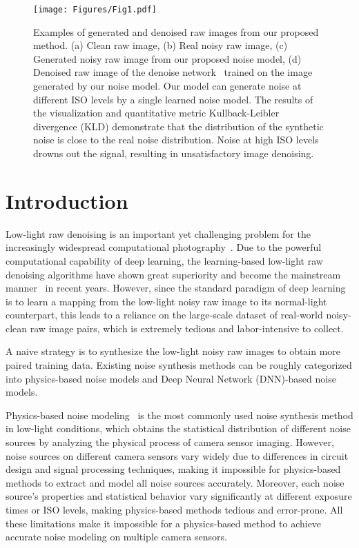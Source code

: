 \documentclass[10pt,twocolumn,letterpaper]{article}
\begin{document}
\begin{figure}[t]
\centering
\texttt{[image: Figures/Fig1.pdf]}
\caption{Examples of generated and denoised raw images from our proposed method. (a) Clean raw image, (b) Real noisy raw image, (c) Generated noisy raw image from our proposed noise model, (d) Denoised raw image of the denoise network~\cite{chen2018learning} trained on the image generated by our noise model. Our model can generate noise at different ISO levels by a single learned noise model. The results of the visualization and quantitative metric Kullback-Leibler divergence (KLD) demonstrate that the distribution of the synthetic noise is close to the real noise distribution. Noise at high ISO levels drowns out the signal, resulting in unsatisfactory image denoising.}
\label{fig:intro}
\end{figure}

\section{Introduction}
\label{intro}
Low-light raw denoising is an important yet challenging problem for the increasingly widespread computational photography~\cite{wang2020practical}. Due to the powerful computational capability of deep learning, the learning-based low-light raw denoising algorithms have shown great superiority and become the mainstream manner~\cite{chen2018learning,feng2022learnability} in recent years. However, since the standard paradigm of deep learning is to learn a mapping from the low-light noisy raw image to its normal-light counterpart, this leads to a reliance on the large-scale dataset of real-world noisy-clean raw image pairs, which is extremely tedious and labor-intensive to collect.

A naive strategy is to synthesize the low-light noisy raw images to obtain more paired training data. Existing noise synthesis methods can be roughly categorized into physics-based noise models and Deep Neural Network (DNN)-based noise models. 

Physics-based noise modeling~\cite{foi2008practical, wei2020physics, wang2019enhancing} is the most commonly used noise synthesis method in low-light conditions, which obtains the statistical distribution of different noise sources by analyzing the physical process of camera sensor imaging. However, noise sources on different camera sensors vary widely due to differences in circuit design and signal processing techniques, making it impossible for physics-based methods to extract and model all noise sources accurately. Moreover, each noise source's properties and statistical behavior vary significantly at different exposure times or ISO levels, making physics-based methods tedious and error-prone. All these limitations make it impossible for a physics-based method to achieve accurate noise modeling on multiple camera sensors.
\end{document}
